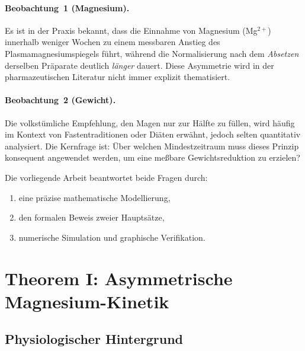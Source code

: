 ﻿\documentclass[12pt,a4paper]{article}
\theoremstyle{plain}
\theoremstyle{definition}
\theoremstyle{remark}
\begin{document}
\paragraph{Beobachtung~1 (Magnesium).}
Es ist in der Praxis bekannt, dass die Einnahme von Magnesium
(Mg$^{2+}$) innerhalb weniger Wochen zu einem messbaren Anstieg des
Plasmamagnesiumspiegels führt, während die Normalisierung nach dem
\emph{Absetzen} derselben Präparate deutlich \emph{länger} dauert. Diese
Asymmetrie wird in der pharmazeutischen Literatur nicht immer explizit
thematisiert.

\paragraph{Beobachtung~2 (Gewicht).}
Die volkstümliche Empfehlung, den Magen nur zur Hälfte zu füllen, wird
häufig im Kontext von Fastentraditionen oder Diäten erwähnt, jedoch selten
quantitativ analysiert. Die Kernfrage ist: Über welchen Mindestzeitraum muss
dieses Prinzip konsequent angewendet werden, um eine meßbare
Gewichtsreduktion zu erzielen?

Die vorliegende Arbeit beantwortet beide Fragen durch:
\begin{enumerate}[label=(\roman*)]
  \item eine präzise mathematische Modellierung,
  \item den formalen Beweis zweier Hauptsätze,
  \item numerische Simulation und graphische Verifikation.
\end{enumerate}

\section{Theorem I: Asymmetrische Magnesium-Kinetik}
\label{sec:mg}

\subsection{Physiologischer Hintergrund}
\end{document}
